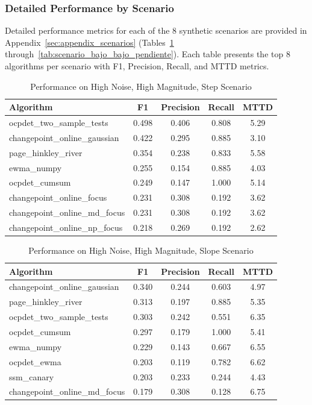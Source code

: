 \documentclass[journal,article,submit,pdftex,moreauthors]{Definitions/mdpi}
\begin{document}
\subsubsection{Detailed Performance by Scenario}

Detailed performance metrics for each of the 8 synthetic scenarios are provided in Appendix~\ref{sec:appendix_scenarios} (Tables~\ref{tab:scenario_alto_alto_escalon} through~\ref{tab:scenario_bajo_bajo_pendiente}). Each table presents the top 8 algorithms per scenario with F1, Precision, Recall, and MTTD metrics.

\begin{table}[ht]
\centering
\caption{Performance on High Noise, High Magnitude, Step Scenario}
\label{tab:scenario_alto_alto_escalon}
\small
\begin{tabular}{lcccc}
\toprule
\textbf{Algorithm} & \textbf{F1} & \textbf{Precision} & \textbf{Recall} & \textbf{MTTD} \\
\midrule
ocpdet\_two\_sample\_tests & 0.498 & 0.406 & 0.808 & 5.29 \\
changepoint\_online\_gaussian & 0.422 & 0.295 & 0.885 & 3.10 \\
page\_hinkley\_river & 0.354 & 0.238 & 0.833 & 5.58 \\
ewma\_numpy & 0.255 & 0.154 & 0.885 & 4.03 \\
ocpdet\_cumsum & 0.249 & 0.147 & 1.000 & 5.14 \\
changepoint\_online\_focus & 0.231 & 0.308 & 0.192 & 3.62 \\
changepoint\_online\_md\_focus & 0.231 & 0.308 & 0.192 & 3.62 \\
changepoint\_online\_np\_focus & 0.218 & 0.269 & 0.192 & 2.62 \\
\bottomrule
\end{tabular}
\end{table}

\clearpage

\begin{table}[ht]
\centering
\caption{Performance on High Noise, High Magnitude, Slope Scenario}
\label{tab:scenario_alto_alto_pendiente}
\small
\begin{tabular}{lcccc}
\toprule
\textbf{Algorithm} & \textbf{F1} & \textbf{Precision} & \textbf{Recall} & \textbf{MTTD} \\
\midrule
changepoint\_online\_gaussian & 0.340 & 0.244 & 0.603 & 4.97 \\
page\_hinkley\_river & 0.313 & 0.197 & 0.885 & 5.35 \\
ocpdet\_two\_sample\_tests & 0.303 & 0.242 & 0.551 & 6.35 \\
ocpdet\_cumsum & 0.297 & 0.179 & 1.000 & 5.41 \\
ewma\_numpy & 0.229 & 0.143 & 0.667 & 6.55 \\
ocpdet\_ewma & 0.203 & 0.119 & 0.782 & 6.62 \\
ssm\_canary & 0.203 & 0.233 & 0.244 & 4.43 \\
changepoint\_online\_md\_focus & 0.179 & 0.308 & 0.128 & 6.75 \\
\bottomrule
\end{tabular}
\end{table}
\end{document}
